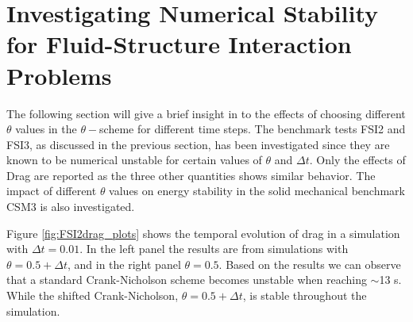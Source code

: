 \section{Investigating Numerical Stability for Fluid-Structure Interaction Problems}
The following section will give a brief insight in to the effects of choosing different $\theta$ values in the $\theta-$scheme for different time steps. 
The benchmark tests FSI2 and FSI3, as discussed in the previous section, has been investigated since they are known to be numerical unstable for certain values of $\theta$ and $\Delta t$. Only the effects of Drag are reported as the three other quantities shows similar behavior. 
The impact of different $\theta$ values on energy stability in the solid mechanical benchmark CSM3 is also investigated.
\newpage

Figure \ref{fig:FSI2drag_plots} shows the temporal evolution of drag in a simulation with $\Delta t = 0.01$. In the left panel the results are from simulations with $\theta = 0.5 + \Delta t$, and in the right panel $\theta = 0.5$. Based on the results we can observe that a standard Crank-Nicholson scheme becomes unstable when reaching $\sim$13 s. While the shifted Crank-Nicholson,  $\theta = 0.5 + \Delta t$, is stable throughout the simulation.


